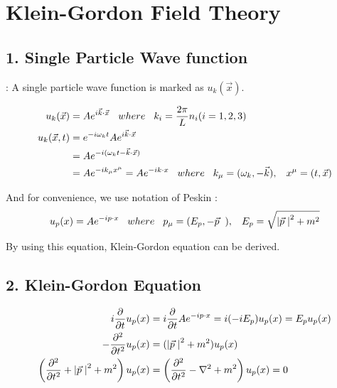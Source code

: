 \documentclass[11pt,letterpaper]{article}
\begin{document}
\newpage

\section*{Klein-Gordon Field Theory}
\subsection*{1. Single Particle Wave function}
\HS : A single particle wave function is marked as $u_{k}(\vec{x})$. 

\begin{equation}
\begin{split}
  u_{k}(\vec{x}) &= Ae^{i\vec{k}\cdot\vec{x}}\hspace{0.3cm} where \hspace{0.3cm} k_{i} = \frac{2\pi}{L} n_{i}(i = 1,2,3) \\
  u_{k}(\vec{x},t) &= e^{-i\omega_{k}t}Ae^{i\vec{k}\cdot\vec{x}} \\
  &= Ae^{-i(\omega_{k}t - \vec{k}\cdot\vec{x})} \\
  &= Ae^{-ik_{\mu}x^{\mu}} = Ae^{-ik \cdot x} \hspace{0.3cm} where \hspace{0.3cm} k_{\mu} = (\omega_{k},-\vec{k}), \hspace{0.3cm} x^{\mu} = (t,\vec{x}) \\
\end{split}
\end{equation}

And for convenience, we use notation of Peskin :
\begin{equation}
 u_{p}(x) = Ae^{-ip \cdot x} \HS where \HS p_{\mu} = (E_{p},-\vp\hs), \HS E_{p} = \sqrt{\avp^2 + m^2}
\end{equation}

By using this equation, Klein-Gordon equation can be derived.

\VS

\subsection*{2. Klein-Gordon Equation}
\begin{equation}
\begin{split}
i\frac{\partial}{\partial t}u_{p}(x) &= i\frac{\partial}{\partial t}Ae^{-ip \cdot x} = i(-iE_{p})u_{p}(x) = E_{p}u_{p}(x) \\
-\frac{\partial^2}{\partial t^2}u_{p}(x)&= (\left|\vec{p}\hspace{0.1cm}\right|^2 + m^2)u_{p}(x) \\
\left( \frac{\partial^2}{\partial t^2} + \left|\vec{p}\hspace{0.1cm}\right|^2 + m^2 \right)u_{p}(x) &= \left( \dfrac{\partial^2}{\partial t^2}-\nabla^2 + m^2 \right)u_{p}(x) = 0
\end{split}
\end{equation}
\end{document}
